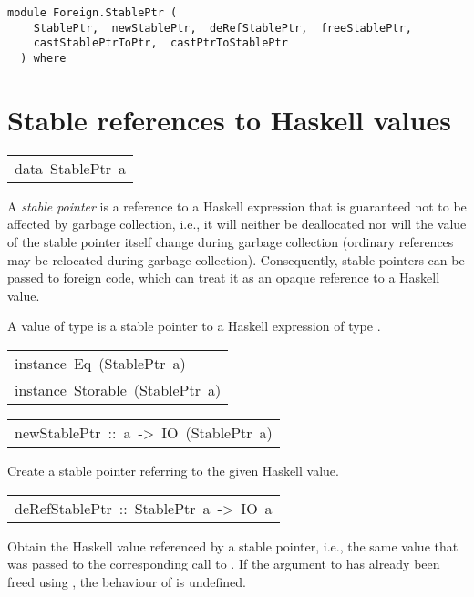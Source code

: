 \label{module:Foreign.StablePtr}
\haddockbeginheader
{\haddockverb\begin{verbatim}
module Foreign.StablePtr (
    StablePtr,  newStablePtr,  deRefStablePtr,  freeStablePtr, 
    castStablePtrToPtr,  castPtrToStablePtr
  ) where\end{verbatim}}
\haddockendheader

\section{Stable references to Haskell values
}
\begin{haddockdesc}
\item[\begin{tabular}{@{}l}
data\ StablePtr\ a
\end{tabular}]\haddockbegindoc
A \emph{stable pointer} is a reference to a Haskell expression that is
guaranteed not to be affected by garbage collection, i.e., it will neither be
deallocated nor will the value of the stable pointer itself change during
garbage collection (ordinary references may be relocated during garbage
collection).  Consequently, stable pointers can be passed to foreign code,
which can treat it as an opaque reference to a Haskell value.
\par
A value of type  is a stable pointer to a Haskell
expression of type .
\par

\end{haddockdesc}
\begin{haddockdesc}
\item[\begin{tabular}{@{}l}
instance\ Eq\ (StablePtr\ a)\\instance\ Storable\ (StablePtr\ a)
\end{tabular}]
\end{haddockdesc}
\begin{haddockdesc}
\item[\begin{tabular}{@{}l}
newStablePtr\ ::\ a\ ->\ IO\ (StablePtr\ a)
\end{tabular}]\haddockbegindoc
Create a stable pointer referring to the given Haskell value.
\par

\end{haddockdesc}
\begin{haddockdesc}
\item[\begin{tabular}{@{}l}
deRefStablePtr\ ::\ StablePtr\ a\ ->\ IO\ a
\end{tabular}]\haddockbegindoc
Obtain the Haskell value referenced by a stable pointer, i.e., the
 same value that was passed to the corresponding call to
 .  If the argument to  has
 already been freed using , the behaviour of
  is undefined.
\par

\end{haddockdesc}
